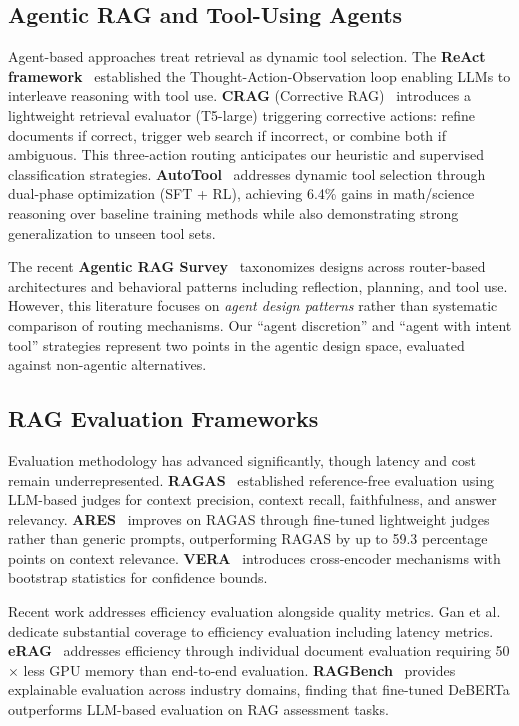 \documentclass[twocolumn,10pt]{article}
\begin{document}
\subsection{Agentic RAG and Tool-Using Agents}

Agent-based approaches treat retrieval as dynamic tool selection. The \textbf{ReAct framework}~\cite{react} established the Thought-Action-Observation loop enabling LLMs to interleave reasoning with tool use. \textbf{CRAG} (Corrective RAG)~\cite{crag} introduces a lightweight retrieval evaluator (T5-large) triggering corrective actions: refine documents if correct, trigger web search if incorrect, or combine both if ambiguous. This three-action routing anticipates our heuristic and supervised classification strategies. \textbf{AutoTool}~\cite{autotool} addresses dynamic tool selection through dual-phase optimization (SFT + RL), achieving 6.4\% gains in math/science reasoning over baseline training methods while also demonstrating strong generalization to unseen tool sets.

The recent \textbf{Agentic RAG Survey}~\cite{agenticragsurvey} taxonomizes designs across router-based architectures and behavioral patterns including reflection, planning, and tool use. However, this literature focuses on \emph{agent design patterns} rather than systematic comparison of routing mechanisms. Our ``agent discretion'' and ``agent with intent tool'' strategies represent two points in the agentic design space, evaluated against non-agentic alternatives.

\subsection{RAG Evaluation Frameworks}

Evaluation methodology has advanced significantly, though latency and cost remain underrepresented. \textbf{RAGAS}~\cite{ragas} established reference-free evaluation using LLM-based judges for context precision, context recall, faithfulness, and answer relevancy. \textbf{ARES}~\cite{ares} improves on RAGAS through fine-tuned lightweight judges rather than generic prompts, outperforming RAGAS by up to 59.3 percentage points on context relevance. \textbf{VERA}~\cite{vera} introduces cross-encoder mechanisms with bootstrap statistics for confidence bounds.

Recent work addresses efficiency evaluation alongside quality metrics. Gan et al.~\cite{ragsurvey} dedicate substantial coverage to efficiency evaluation including latency metrics. \textbf{eRAG}~\cite{erag} addresses efficiency through individual document evaluation requiring 50$\times$ less GPU memory than end-to-end evaluation. \textbf{RAGBench}~\cite{ragbench} provides explainable evaluation across industry domains, finding that fine-tuned DeBERTa outperforms LLM-based evaluation on RAG assessment tasks.
\end{document}
